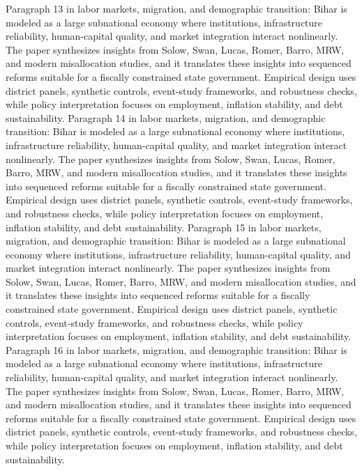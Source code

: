 \documentclass[preprint,12pt]{elsarticle}
\begin{document}
Paragraph 13 in labor markets, migration, and demographic transition: Bihar is modeled as a large subnational economy where institutions, infrastructure reliability, human-capital quality, and market integration interact nonlinearly. The paper synthesizes insights from Solow, Swan, Lucas, Romer, Barro, MRW, and modern misallocation studies, and it translates these insights into sequenced reforms suitable for a fiscally constrained state government. Empirical design uses district panels, synthetic controls, event-study frameworks, and robustness checks, while policy interpretation focuses on employment, inflation stability, and debt sustainability.
Paragraph 14 in labor markets, migration, and demographic transition: Bihar is modeled as a large subnational economy where institutions, infrastructure reliability, human-capital quality, and market integration interact nonlinearly. The paper synthesizes insights from Solow, Swan, Lucas, Romer, Barro, MRW, and modern misallocation studies, and it translates these insights into sequenced reforms suitable for a fiscally constrained state government. Empirical design uses district panels, synthetic controls, event-study frameworks, and robustness checks, while policy interpretation focuses on employment, inflation stability, and debt sustainability.
Paragraph 15 in labor markets, migration, and demographic transition: Bihar is modeled as a large subnational economy where institutions, infrastructure reliability, human-capital quality, and market integration interact nonlinearly. The paper synthesizes insights from Solow, Swan, Lucas, Romer, Barro, MRW, and modern misallocation studies, and it translates these insights into sequenced reforms suitable for a fiscally constrained state government. Empirical design uses district panels, synthetic controls, event-study frameworks, and robustness checks, while policy interpretation focuses on employment, inflation stability, and debt sustainability.
Paragraph 16 in labor markets, migration, and demographic transition: Bihar is modeled as a large subnational economy where institutions, infrastructure reliability, human-capital quality, and market integration interact nonlinearly. The paper synthesizes insights from Solow, Swan, Lucas, Romer, Barro, MRW, and modern misallocation studies, and it translates these insights into sequenced reforms suitable for a fiscally constrained state government. Empirical design uses district panels, synthetic controls, event-study frameworks, and robustness checks, while policy interpretation focuses on employment, inflation stability, and debt sustainability.
\end{document}
